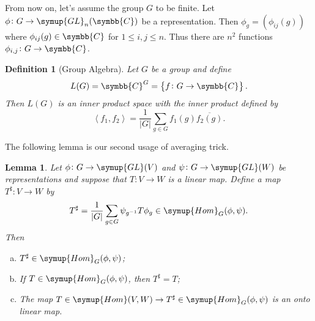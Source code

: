 \documentclass{assignment}[2019/10/15]
\newcommand{\lr}[3]{\left#1#3\right#2}
\theoremstyle{plain}
\newtheorem{definition}[theorem]{Definition}
\newtheorem{lemma}[theorem]{Lemma}
\newcommand{\BC}{\symbb{C}}
\newcommand{\Hom}{\mathop{}\!\symup{Hom}}
\newcommand{\GL}{\mathop{}\!\symup{GL}}
\numberwithin{equation}{section}
\begin{document}
    From now on, let's assume the group $G$ to be finite. Let $\phi\colon G\to \GL_n(\BC)$ be a representation. Then $\phi_g=\lr(){\phi_{ij}(g)}$ where $\phi_{ij}(g)\in\BC$ for $1\leq i, j\leq n$. Thus there are $n^2$ functions $\phi_{i, j}\colon G\to \BC$.

    \begin{definition}[Group Algebra]
        Let $G$ be a group and define
        \begin{equation}
            L(G) = \BC^G = \lr\{\}{f\colon G\to\BC}.
        \end{equation}
        Then $L(G)$ is an inner product space with the inner product defined by
        \begin{equation}
            \lr<>{f_1, f_2} = \frac{1}{|G|}\sum_{g\in G}f_1(g)\overline{f_2(g)}.
        \end{equation}
    \end{definition}

    The following lemma is our second usage of averaging trick.

    \begin{lemma}\label{lem: sharp}
        Let $\phi\colon G\to \GL(V)$ and $\psi\colon G\to\GL(W)$ be representations and suppose that $T\colon V\to W$ is a linear map. Define a map $T^\sharp\colon V\to W$ by
        \begin{equation}
            T^\sharp = \frac{1}{|G|}\sum_{g\in G}\psi_{g^{-1}}T\phi_g\in\Hom_G(\phi, \psi).
        \end{equation}
        Then
        \begin{enumerate}[(a)]
            \item $T^\sharp\in\Hom_G(\phi, \psi)$;
            \item If $T\in\Hom_G(\phi, \psi)$, then $T^\sharp = T$;
            \item The map $T\in\Hom(V, W)\to T^\sharp\in\Hom_G(\phi, \psi)$ is an onto linear map.
        \end{enumerate}
    \end{lemma}
\end{document}
